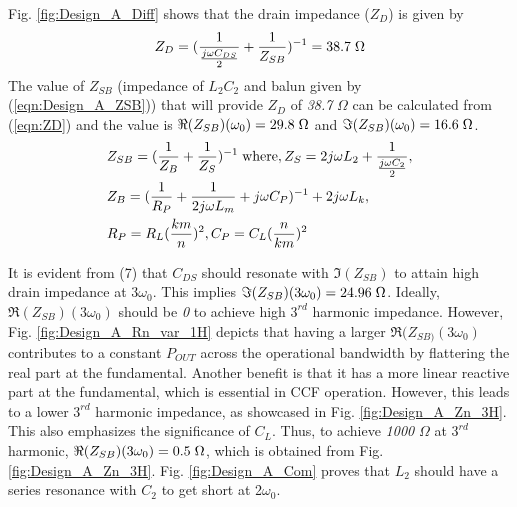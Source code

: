 \documentclass[conference]{IEEEtran}
\begin{document}
Fig. \ref{fig:Design_A_Diff} shows that the drain impedance ($Z_D$) is given by
\vspace{-0.05in}
\begin{equation}
    Z_D=(\frac{1}{\frac{j\omega C_{DS}}{2}}+\frac{1}{Z_{SB}})^{-1}=38.7 \hspace{1mm} \Omega
    \label{eqn:ZD}
\end{equation}
The value of $Z_{SB}$ (impedance of $L_2C_2$ and balun given by (\ref{eqn:Design_A_ZSB})) that will provide $Z_D$ of \textit{38.7} $\Omega$ can be calculated from (\ref{eqn:ZD}) and the value is $\Re(Z_{SB})(\omega_0) =  29.8\hspace{1mm} \Omega$ and $\Im(Z_{SB})(\omega_0) = 16.6\hspace{1mm}\Omega$.
\vspace{-0.05in}
\begin{equation}
\begin{aligned}
    &Z_{SB}=(\frac{1}{Z_B}+\frac{1}{Z_S})^{-1}
    \hspace{1mm}\text{where}, Z_S=2j\omega  L_2+\frac{1}{\frac{j \omega C_2}{2}}, \\
    &Z_B=(\frac{1}{R_P}+\frac{1}{2j \omega  L_m}+j \omega C_P)^{-1}+2j \omega  L_k,\\ &R_P=R_L(\frac{km}{n})^2,C_P=C_L(\frac{n}{km})^2
\label{eqn:Design_A_ZSB}
\end{aligned}
\end{equation}

It is evident from (7) that $C_{DS}$ should resonate with $\Im(Z_{SB})$ to attain high drain impedance at $3\omega_0$. This implies $\Im(Z_{SB})(3\omega_0) = 24.96\hspace{1mm}\Omega$. Ideally, $\Re(Z_{SB})(3\omega_0)$ should be \textit{0} to achieve high $3^{rd}$ harmonic impedance. However, Fig. \ref{fig:Design_A_Rn_var_1H} depicts that having a larger $\Re(Z_{SB)}(3\omega_0)$ contributes to a constant $P_{OUT}$ across the operational bandwidth by flattering the real part at the fundamental. Another benefit is that it has a  more linear reactive part at the fundamental, which is essential in CCF operation.
However, this leads to a lower $3^{rd}$ harmonic impedance, as showcased in Fig. \ref{fig:Design_A_Zn_3H}. This also emphasizes  the significance of $C_L$. Thus, to achieve \textit{1000} $\Omega$ at $3^{rd}$ harmonic,  $\Re(Z_{SB})(3\omega_0) = 0.5\hspace{1mm}\Omega$, which is obtained from Fig. \ref{fig:Design_A_Zn_3H}. Fig. \ref{fig:Design_A_Com} proves that $L_2$ should have a series resonance with $C_2$ to get short at 2$\omega_0$.
\end{document}
